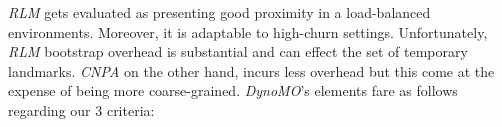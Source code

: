 \emph{RLM} gets evaluated as presenting good proximity in a load-balanced 
environments. Moreover, it is adaptable to high-churn settings.
Unfortunately, \emph{RLM} bootstrap overhead is substantial and can 
effect  the set of temporary landmarks.
\emph{CNPA} on the other hand, incurs less overhead but this come 
at the expense of being more coarse-grained.
%
%
%
\emph{DynoMO}'s elements fare as follows regarding our $3$ criteria:
